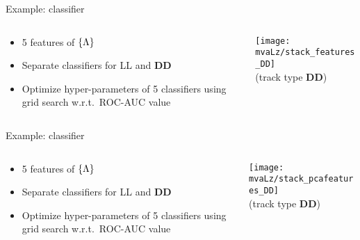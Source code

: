 \begin{frame}{Example: \Lz classifier}
    \begin{columns}
        \begin{column}{.45\textwidth}
            \scalebox{1.2}{\Lz classifier}
            \begin{itemize}
                \item 5 features of $\{ {\Lambda} \}$
                \item Separate classifiers for LL and \textbf{DD}
                \item Optimize hyper-parameters of \textcolor{vertexDarkRed}{5 classifiers} using grid search w.r.t.\ ROC-AUC\ftnt{} value
            \end{itemize}
        \end{column}
        \begin{column}{.5\textwidth}
            \centering
            \texttt{[image: mvaLz/stack\_features\_DD]}\\
            (track type \textbf{DD})
        \end{column}
    \end{columns}
\end{frame}

\begin{frame}{Example: \Lz classifier}
    \begin{columns}
        \begin{column}{.45\textwidth}
            \scalebox{1.2}{\Lz classifier}
            \begin{itemize}
                \item 5 features of $\{ {\Lambda} \}$
                \item Separate classifiers for LL and \textbf{DD}
                \item Optimize hyper-parameters of \textcolor{vertexDarkRed}{5 classifiers} using grid search w.r.t.\ ROC-AUC\ftnt{} value
            \end{itemize}
        \end{column}
        \begin{column}{.5\textwidth}
            \centering
            \texttt{[image: mvaLz/stack\_pcafeatures\_DD]}\\
            (track type \textbf{DD})
        \end{column}
    \end{columns}
\end{frame}

